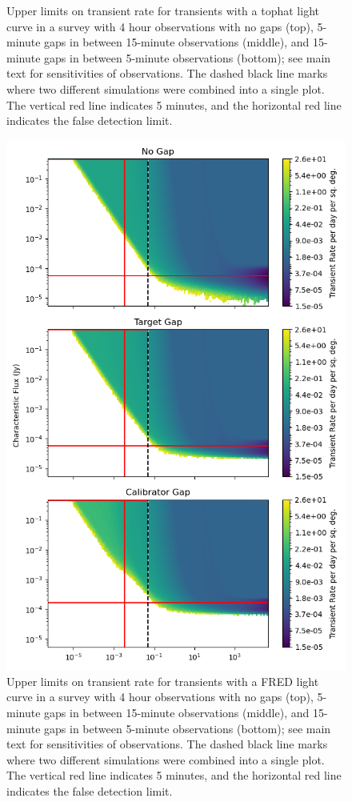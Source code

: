 \documentclass[12pt]{article}
\begin{document}
\begin{figure}
\caption{Upper limits on transient rate for transients with a tophat light curve in a survey with 4 hour observations with no gaps (top), 5-minute gaps in between 15-minute observations (middle), and 15-minute gaps in between 5-minute observations (bottom); see main text for sensitivities of observations. The dashed black line marks where two different simulations were combined into a single plot. The vertical red line indicates 5 minutes, and the horizontal red line indicates the false detection limit.}
\label{fig3}
 \end{figure}
 
 \begin{figure}
\includegraphics[width=\columnwidth]{figure4.png}
\caption{Upper limits on transient rate for transients with a FRED light curve in a survey with 4 hour observations with no gaps (top), 5-minute gaps in between 15-minute observations (middle), and 15-minute gaps in between 5-minute observations (bottom); see main text for sensitivities of observations. The dashed black line marks where two different simulations were combined into a single plot. The vertical red line indicates 5 minutes, and the horizontal red line indicates the false detection limit.}
\label{fig4}
 \end{figure}
 
\end{document}
